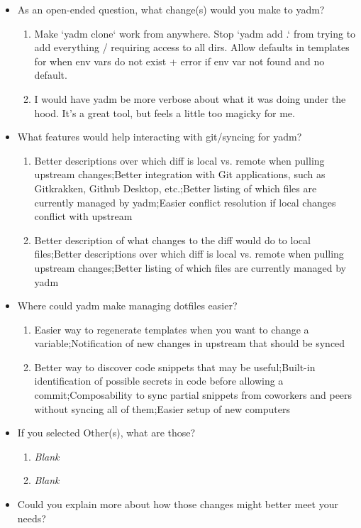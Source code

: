 \documentclass[letterpaper]{jdf}
\begin{document}
\begin{itemize}
	\item As an open-ended question, what change(s) would you make to yadm?
	\begin{enumerate}
		\item Make `yadm clone` work from anywhere. Stop `yadm add .` from trying to add everything / requiring access to all dirs. Allow defaults in templates for when env vars do not exist + error if env var not found and no default.
		\item I would have yadm be more verbose about what it was doing under the hood. It's a great tool, but feels a little too magicky for me.
	\end{enumerate}
	\item What features would help interacting with git/syncing for yadm?
	\begin{enumerate}
		\item Better descriptions over which diff is local vs. remote when pulling upstream changes;Better integration with Git applications, such as Gitkrakken, Github Desktop, etc.;Better listing of which files are currently managed by yadm;Easier conflict resolution if local changes conflict with upstream
		\item Better description of what changes to the diff would do to local files;Better descriptions over which diff is local vs. remote when pulling upstream changes;Better listing of which files are currently managed by yadm
	\end{enumerate}
	\item Where could yadm make managing dotfiles easier?
	\begin{enumerate}
		\item Easier way to regenerate templates when you want to change a variable;Notification of new changes in upstream that should be synced
		\item Better way to discover code snippets that may be useful;Built-in identification of possible secrets in code before allowing a commit;Composability to sync partial snippets from coworkers and peers without syncing all of them;Easier setup of new computers
	\end{enumerate}
	\item If you selected Other(s), what are those?
	\begin{enumerate}
		\item \emph{Blank}
		\item \emph{Blank}
	\end{enumerate}
	\item Could you explain more about how those changes might better meet your needs?

\end{itemize}
\end{document}
